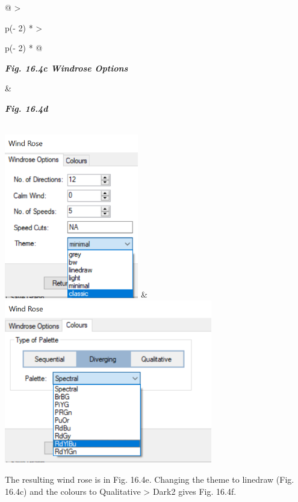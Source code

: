 \documentclass[
  letterpaper,
  DIV=11,
  numbers=noendperiod]{scrreprt}
\begin{document}
\begin{longtable}[]{@{}
  >{\raggedright\arraybackslash}p{(\columnwidth - 2\tabcolsep) * }
  >{\raggedright\arraybackslash}p{(\columnwidth - 2\tabcolsep) * }@{}}
\toprule\noalign{}
\begin{minipage}[b]{\linewidth}\raggedright
\textbf{\emph{Fig. 16.4c Windrose Options}}
\end{minipage} & \begin{minipage}[b]{\linewidth}\raggedright
\textbf{\emph{Fig. 16.4d}}
\end{minipage} \\
\midrule\noalign{}
\endhead
\bottomrule\noalign{}
\endlastfoot
\includegraphics[width=2.30567in,height=2.82653in]{figures/Fig16.4c.png}
&
\includegraphics[width=3.57657in,height=2.8057in]{figures/Fig16.4d.png} \\
\end{longtable}

The resulting wind rose is in Fig. 16.4e. Changing the theme to linedraw
(Fig. 16.4c) and the colours to Qualitative \textgreater{} Dark2 gives
Fig. 16.4f.
\end{document}
